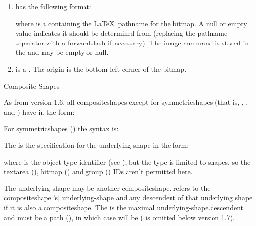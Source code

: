 \begin{numbered}
\begin{enumerate}
  \item\label{jdr:latexbitmap}
   has the following format:
  \begin{syntaxline}
  \end{syntaxline}
  where  is a  containing the \LaTeX\
  pathname for the bitmap. A null or empty value indicates it should
  be determined from \meta{filename} (replacing the pathname
  separator with a \gls{forwardslash} if necessary). The image command is stored
  in the \type{string} \meta{imgcmd} and may be empty or null.

  \item {} is a . The origin
  is the bottom left corner of the \gls{bitmap}.
  \end{enumerate}%

\item \label{jdr:composite}Composite Shapes

As from version 1.6, all \glspl{compositeshape} except
for \glspl{symmetricshape} (that is, 
\hyperref[jdr:textpath]{},
\hyperref[jdr:rotational]{},
\hyperref[jdr:scaled]{} and 
\hyperref[jdr:spiral]{}) have  in
the form:
\begin{syntaxline}
 
\end{syntaxline}
For \glspl{symmetricshape} (\hyperref[jdr:symmetric]{\code{S}}) the syntax is:
\begin{syntaxline}
 
\end{syntaxline}

The  is the specification for the
underlying shape in the form:
\begin{syntaxline}
 
\end{syntaxline}
where  is the object type identifier (see
), but the type is limited to shapes, so the 
\gls*{textarea} (\hyperref[jdr:textarea]{\code{T}}), 
\gls*{bitmap} (\hyperref[jdr:bitmap]{}) and
\gls*{group} (\hyperref[jdr:group]{}) IDs aren't permitted here.

The \gls{underlying-shape} may be another \gls{compositeshape}.
\emph{} 
refers to the \gls{compositeshape}['s]
\gls{underlying-shape} and any descendent of that underlying shape if it
is also a \gls*{compositeshape}. The
\emph{} is the
maximal \gls{underlying-shape.descendent} and must be a 
\gls*{path} (\hyperref[jdr:path]{}),
in which case   will be
\code{P}   
(\meta{anchor info} is omitted below version 1.7).


\end{numbered}
